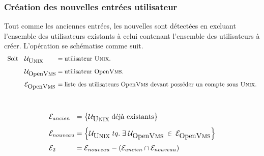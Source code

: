 \subsubsection{\label{adv-programming-ex3-devlextn}Cr{\'e}ation des nouvelles entr{\'e}es utilisateur}

Tout comme les anciennes entr{\'e}es, les nouvelles sont d{\'e}tect{\'e}es en excluant l'ensemble
des utilisateurs existants {\`a} celui contenant l'ensemble des utilisateurs {\`a} cr{\'e}er. L'op{\'e}ration
se sch{\'e}matise comme suit.
\begin{displaymath}
\begin{array}{l@{\quad}l@{\;=\;}l}
	\mbox{Soit}	&
		\mathcal{U}_{\mbox{{\Unix}}} 		&	\mbox{utilisateur {\Unix}.} 	\\[2ex]
				&
		\mathcal{U}_{\mbox{{\OpenVMS}}} 	&	\mbox{utilisateur {\OpenVMS}.}	\\[2ex]
				&
		\mathcal{E}_{\mbox{{\OpenVMS}}}		&	\mbox{liste des utilisateurs
					{\OpenVMS} devant poss{\'e}der un compte sous {\Unix}.}			\\[2ex]
\end{array}
\end{displaymath}
\\
\begin{displaymath}
\begin{array}{l@{\;=\;}l}
	\mathcal{E}_{ancien}		&
		\left\{ \mathcal{U}_{\mbox{{\Unix}}} \; \mbox{d{\'e}j{\`a} existants} \right\}
		\\[2ex]
	\mathcal{E}_{nouveau}	&
		\left\{ \mathcal{U}_{\mbox{{\Unix}}} \; tq. \;
			\exists \; \mathcal{U}_{\mbox{{\OpenVMS}}} \: \in \: \mathcal{E}_{\mbox{{\OpenVMS}}}
			\right\}
		\\[2ex]
	\mathcal{E}_{2}			&
		\mathcal{E}_{nouveau} - \left( \mathcal{E}_{ancien} \cap \mathcal{E}_{nouveau} \right)
		\\[2ex]
\end{array}
\end{displaymath}

